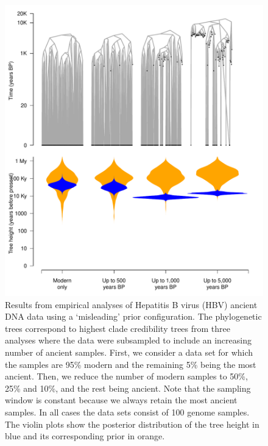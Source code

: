 \documentclass[11pt]{article}
\begin{document}
\begin{figure}[H]
    \begin{center}
        \includegraphics[scale=0.7, angle=0]{empirical_results_depth_misleading_prior_tree_height.pdf}
        \caption{Results from empirical analyses of Hepatitis B virus (HBV) ancient DNA data using a `misleading' prior configuration. The phylogenetic trees correspond to highest clade credibility trees from three analyses where the data were subsampled to include an increasing number of ancient samples. First, we consider a data set for which the samples are 95\% modern and the remaining 5\% being the most ancient. Then, we reduce the number of modern samples to 50\%, 25\% and 10\%, and the rest being ancient. Note that the sampling window is constant because we always retain the most ancient samples. In all cases the data sets consist of 100 genome samples. The violin plots show the posterior distribution of the tree height in blue and its corresponding prior in orange.}
        \label{figure:Fig3}
    \end{center}
\end{figure}
\end{document}
